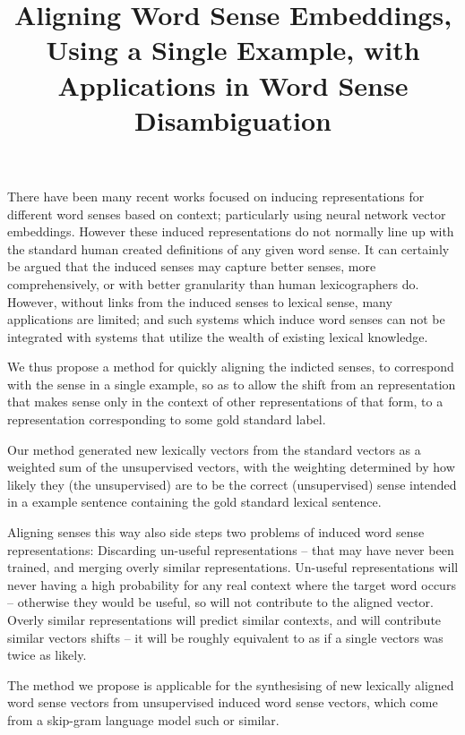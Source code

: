 \documentclass{sig-alternate}
\begin{document}
\title{Aligning Word Sense Embeddings, Using a Single Example, with Applications in Word Sense Disambiguation}
\maketitle


There have been many recent works focused on inducing representations for different word senses based on context; particularly using neural network vector embeddings.
However these induced representations do not normally line up with the standard human created definitions of any given word sense.
It can certainly be argued that the induced senses may capture better senses, more comprehensively, or with better granularity than human lexicographers do.
However, without links from the induced senses to lexical sense, many applications are limited; and such systems which induce word senses can not be integrated with systems that utilize the wealth of existing lexical knowledge.

We thus propose a method for quickly aligning the indicted senses, to correspond with the sense in a single example, so as to allow the shift from an representation that makes sense only in the context of other representations of that form, to a representation corresponding to some gold standard label.


Our method generated new lexically vectors from the standard vectors as a weighted sum of the unsupervised vectors, with the weighting determined by how likely they (the unsupervised) are to be the correct (unsupervised) sense intended in a example sentence containing the gold standard lexical sentence.

Aligning senses this way also side steps two problems of induced word sense representations: Discarding un-useful representations -- that may have never been trained, and merging overly similar representations. Un-useful representations will never having a high probability for any real context where the target word occurs -- otherwise they would be useful, so will not contribute to the aligned vector. Overly similar representations will  predict similar contexts, and will contribute similar vectors shifts -- it will be roughly equivalent to as if a single vectors was twice as likely.


The method we propose is applicable for the synthesising of new lexically aligned word sense vectors from unsupervised induced word sense vectors, which come from a skip-gram language model such or similar.
\end{document}
